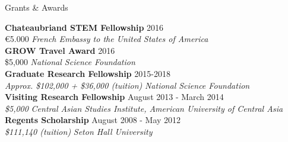 \documentclass{resume} %
\begin{document}
\begin{minipage}{\textwidth}

\begin{rSection}{Grants \& Awards}
\vspace{.15cm}

{\bf Chateaubriand STEM Fellowship} \hfill {2016} \\ 
{\euro{5.000}} \hfill {\em French Embassy to the United States of America} \\


{\bf GROW Travel Award} \hfill {2016} \\ 
{\$5,000} \hfill {\em National Science Foundation} \\


{\bf Graduate Research Fellowship} \hfill {2015-2018} \\ 
{\em Approx. \$102,000 + \$36,000 (tuition)} \hfill {\em National Science Foundation} \\




{\bf Visiting Research Fellowship} \hfill {August 2013 - March 2014} \\ 
{\em \$5,000} \hfill {\em Central Asian Studies Institute, American University of Central Asia} \\


{\bf Regents Scholarship} \hfill {August 2008 - May 2012} \\ 
{\em \$111,140 (tuition)} \hfill {\em Seton Hall University} \\



\end{rSection}
\end{minipage}
\end{document}
